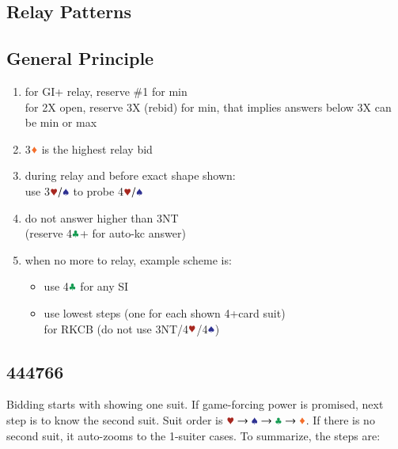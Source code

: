 \documentclass{article}
\newcommand*{\ccc}{\textcolor{ForestGreen}{\clubsuit}}
\newcommand*{\ddd}{\textcolor{Orange}{\vardiamondsuit}}
\newcommand*{\hhh}{\textcolor{Mahogany}{\varheartsuit}}
\newcommand*{\sss}{\textcolor{Blue}{\spadesuit}}
\begin{document}
\begin{multicols}{2}
\section{Relay Patterns}

\subsection{General Principle}
\begin{enumerate}
    \setlength\itemsep{-0.2em}
    \item for GI+ relay, reserve \#1 for min \\
        for 2X open, reserve 3X (rebid) for min,
        that implies answers below 3X can be min or max
    \item 3$\ddd$ is the highest relay bid
    \item during relay and before exact shape shown: \\
        use 3$\hhh/\sss$ to probe 4$\hhh/\sss$
    \item do not answer higher than 3NT \\
        (reserve 4$\ccc$+ for auto-kc answer)
    \item when no more to relay, example scheme is:
    \begin{itemize}
        \setlength\itemsep{-0.2em}
        \item use 4$\ccc$ for any SI
        \item use lowest steps (one for each shown 4+card suit) \\
            for RKCB (do not use 3NT/4$\hhh$/4$\sss$)
    \end{itemize}
\end{enumerate}

\subsection{444766}\label{sec:444766}
Bidding starts with showing one suit. If game-forcing power is promised, next step is to know the second suit.
Suit order is $\hhh \rightarrow \sss \rightarrow \ccc \rightarrow \ddd$. If there is no second suit, it auto-zooms to the 1-suiter cases. To summarize, the steps are:


\end{multicols}
\end{document}
